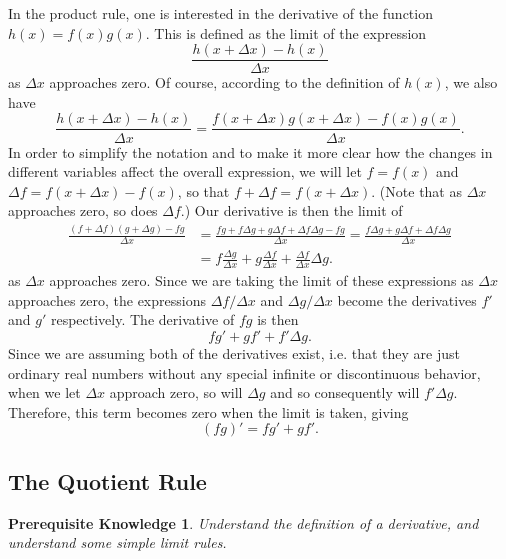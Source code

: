 \documentclass{myarticle}
\theoremstyle{nospace}
\newtheorem*{oldprereq}{Prerequisite Knowledge}
\newenvironment{prereq}
{\begin{mdframed}\begin{oldprereq}}
    {\end{oldprereq}\end{mdframed}}
\newtheorem{old series theorem}{Theorem}
\newenvironment{series theorem}
{\begin{mdframed}\begin{old series theorem}}
    {\end{old series theorem}\end{mdframed}}
\begin{document}
In the product rule, one is interested in the derivative of the
function $h(x) = f(x)g(x)$. This is defined as the limit of the
expression
\[
  \frac{h(x + \Delta x) - h(x)}{\Delta x}
\]
as $\Delta x$ approaches zero. Of course, according to the definition
of $h(x)$, we also have
\[
  \frac{h(x + \Delta x) - h(x)}{\Delta x}
  = \frac{f(x + \Delta x)g(x + \Delta x) - f(x)g(x)}{\Delta x}.
\]
In order to simplify the notation and to make it more clear how the
changes in different variables affect the overall expression, we will
let $f = f(x)$ and $\Delta f = f(x + \Delta x) - f(x)$, so that
$f + \Delta f = f(x + \Delta x)$. (Note that as $\Delta x$ approaches
zero, so does $\Delta f$.) Our derivative is then the limit of
\begin{equation*}
  \begin{split}
    \frac{(f + \Delta f)(g + \Delta g) - fg}{\Delta x}
    &= \frac{fg + f\Delta g + g\Delta f + \Delta f \Delta g -
      fg}{\Delta x}
    = \frac{f\Delta g + g\Delta f + \Delta f \Delta g}{\Delta x} \\
    &= f\frac{\Delta g}{\Delta x} + g\frac{\Delta f}{\Delta x} +
    \frac{\Delta f}{\Delta x}\Delta g.
  \end{split}
\end{equation*}
as $\Delta x$ approaches zero. Since we are taking the limit of these
expressions as $\Delta x$ approaches zero, the expressions
$\Delta f/\Delta x$ and $\Delta g/\Delta x$ become the derivatives
$f'$ and $g'$ respectively. The derivative of $fg$ is then
\[
  fg' + gf' + f'\Delta g.
\]
Since we are assuming both of the derivatives exist, i.e. that they
are just ordinary real numbers without any special infinite or
discontinuous behavior, when we let $\Delta x$ approach zero, so will
$\Delta g$ and so consequently will $f'\Delta g$. Therefore, this term
becomes zero when the limit is taken, giving
\[
  (fg)' = fg' + gf'.
\]

\subsection{The Quotient Rule}
\label{sec:quotient rule}

\begin{prereq}
  Understand the definition of a derivative, and understand some
  simple limit rules.
\end{prereq}
\end{document}

